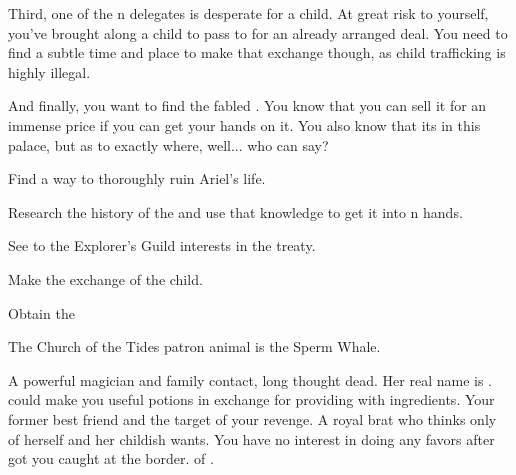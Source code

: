 \documentclass[char]{NeptuneBall}
\begin{document}
Third, one of the \pPacifica{}n delegates is desperate for a child. At great risk to yourself, you've brought along a child to pass to \cBodyguard{\them} for an already arranged deal. You need to find a subtle time and place to make that exchange though, as child trafficking is highly illegal.

And finally, you want to find the fabled \iGlowShell{\MYname}. You know that you can sell it for an immense price if you can get your hands on it. You also know that its in this palace, but as to exactly where, well... who can say?

\begin{itemz}[Goals]
  \item Find a way to thoroughly ruin Ariel's life.
	\item Research the history of the \pGazaStrip{} and use that knowledge to get it into \pAtlantis{}n hands.
	\item See to the Explorer's Guild interests in the treaty.
	\item Make the exchange of the child.
	\item Obtain the \iGlowShell{}
\end{itemz}

\begin{itemz}[Notes]
  \item The Church of the Tides patron animal is the Sperm Whale.
\end{itemz}


\begin{contacts}
  \contact{\cWitch{\MYname}} A powerful magician and family contact, long thought dead. Her real name is \cWitch{}. \cWitch{\They} could make you useful potions in exchange for providing \cWitch{\them} with ingredients.
  \contact{\cAriel{}} Your former best friend and the target of your revenge.
  \contact{\cPrincess{}} A royal brat who thinks only of herself and her childish wants. You have no interest in doing \cPrincess{\them} any favors after \cPrincess{\they} got you caught at the border.
  \contact{\cKing{}} \cKing{\King} of \pAtlantis{}. 
\end{contacts}
\end{document}
